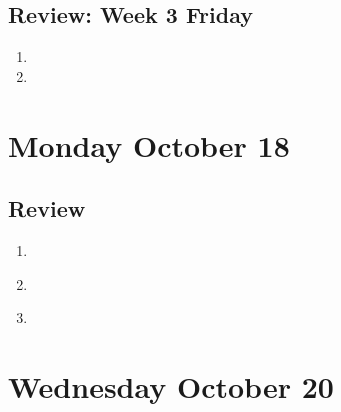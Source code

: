 \documentclass[12pt, oneside]{article}
\begin{document}
\subsection*{Review: Week 3 Friday}
\begin{enumerate}
    \item 
    \item 
\end{enumerate}

\section*{Monday October 18}

\newpage



\newpage

\newpage
\subsection*{Review}
\begin{enumerate}
\item \hspace{1in}\\ 
\item \hspace{1in}\\ 
\item \hspace{1in}\\ 
\end{enumerate}

\newpage
\section*{Wednesday October 20}


\vfill


\newpage




\newpage
\end{document}
